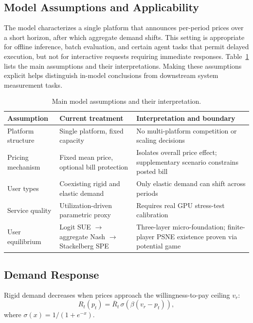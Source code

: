 \documentclass[11pt]{article}
\newcommand{\R}{R}
\begin{document}
\subsection{Model Assumptions and Applicability}

The model characterizes a single platform that announces per-period prices
over a short horizon, after which aggregate demand shifts. This setting is
appropriate for offline inference, batch evaluation, and certain agent tasks
that permit delayed execution, but not for interactive requests requiring
immediate responses. Table~\ref{tab:assumptions} lists the main assumptions
and their interpretations. Making these assumptions explicit helps
distinguish in-model conclusions from downstream system measurement tasks.

\begin{table}[htbp]
\centering
\caption{Main model assumptions and their interpretation.}
\label{tab:assumptions}
\begin{tabular}{p{}p{}p{}}
\toprule
Assumption & Current treatment & Interpretation and boundary \\
\midrule
Platform structure & Single platform, fixed capacity & No multi-platform competition or scaling decisions \\
Pricing mechanism & Fixed mean price, optional bill protection & Isolates overall price effect; supplementary scenario constrains posted bill \\
User types & Coexisting rigid and elastic demand & Only elastic demand can shift across periods \\
Service quality & Utilization-driven parametric proxy & Requires real GPU stress-test calibration \\
User equilibrium & Logit SUE $\to$ aggregate Nash $\to$ Stackelberg SPE & Three-layer micro-foundation; finite-player PSNE existence proven via potential game \\
\bottomrule
\end{tabular}
\end{table}

\subsection{Demand Response}

Rigid demand decreases when prices approach the willingness-to-pay ceiling
$v_r$:
\begin{equation}
  \R_t(p_t)=\overline{\R}_t\,
  \sigma\!\left(\beta(v_r-p_t)\right),
  \label{eq:rigid}
\end{equation}
where $\sigma(x)=1/(1+e^{-x})$.
\end{document}
